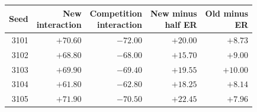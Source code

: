 \begin{tabular}{rrrrr}
\toprule
Seed & \shortstack{New\\interaction} & \shortstack{Competition\\interaction} & \shortstack{New minus\\half ER} & \shortstack{Old minus\\ER}\\
\midrule
3101 & $+70.60$ & $-72.00$ & $+20.00$ & $+8.73$\\
3102 & $+68.80$ & $-68.00$ & $+15.70$ & $+9.00$\\
3103 & $+69.90$ & $-69.40$ & $+19.55$ & $+10.00$\\
3104 & $+61.80$ & $-62.80$ & $+18.25$ & $+8.14$\\
3105 & $+71.90$ & $-70.50$ & $+22.45$ & $+7.96$\\
\bottomrule
\end{tabular}
